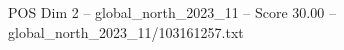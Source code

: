 \begin{textsample}{POS Dim 2 – global\_north\_2023\_11 – Score 30.00 – global\_north\_2023\_11/103161257.txt}
\end{textsample}
